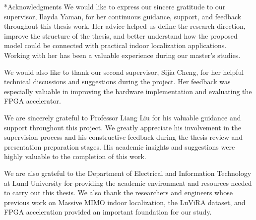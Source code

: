 \documentclass[11pt,twoside]{eitExjobb}
\makeatletter
\renewcommand\chapter{\clearpage\sh@chapter}
\makeatother
\begin{document}
\MakeTitlePage  %
\frontmatter    %
\chapter*{Acknowledgments}
We would like to express our sincere gratitude to our supervisor, Ilayda Yaman, for her continuous guidance, support, and feedback throughout this thesis work. Her advice helped us define the research direction, improve the structure of the thesis, and better understand how the proposed model could be connected with practical indoor localization applications. Working with her has been a valuable experience during our master’s studies.

We would also like to thank our second supervisor, Sijia Cheng, for her helpful technical discussions and suggestions during the project. Her feedback was especially valuable in improving the hardware implementation and evaluating the FPGA accelerator.

We are sincerely grateful to Professor Liang Liu for his valuable guidance and support throughout this project. We greatly appreciate his involvement in the supervision process and his constructive feedback during the thesis review and presentation preparation stages. His academic insights and suggestions were highly valuable to the completion of this work.

We are also grateful to the Department of Electrical and Information Technology at Lund University for providing the academic environment and resources needed to carry out this thesis. We also thank the researchers and engineers whose previous work on Massive MIMO indoor localization, the LuViRA dataset, and FPGA acceleration provided an important foundation for our study.
\end{document}
